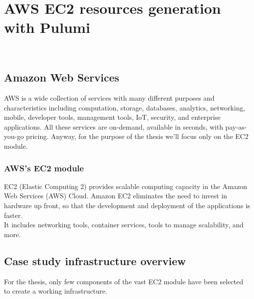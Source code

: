 
\chapter{AWS EC2 resources generation with Pulumi}
\label{cap:case-study}

\\

\section{Amazon Web Services}
AWS is a wide collection of services with many different purposes and characteristics including computation, storage, databases, analytics, networking, mobile, developer tools, management tools, IoT, security, and enterprise applications.
All these services are on-demand, available in seconds, with pay-as-you-go pricing.
Anyway, for the purpose of the thesis we'll focus only on the EC2 module.

\subsection{AWS's EC2 module}
EC2 (Elastic Computing 2) provides scalable computing capacity in the Amazon Web Services (AWS) Cloud.
Amazon EC2 eliminates the need to invest in hardware up front, so that the development and deployment of the applications is faster.\\
It includes networking tools, container services, tools to manage scalability, and more.


\section{Case study infrastructure overview}
For the thesis, only few components of the vast EC2 module have been selected to create a working infrastructure.

